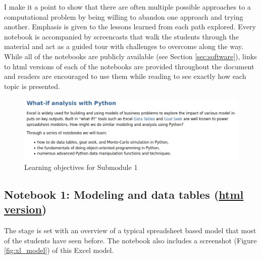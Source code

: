 \documentclass[ited,blindrev]{informs3}              %
\begin{document}
I make it a point to show that there are often multiple possible approaches to a computational problem by being willing to abandon one approach and trying another. Emphasis is given to the lessons learned from each path explored. Every notebook is accompanied by screencasts that walk the students through the material and act as a guided tour with challenges to overcome along the way. While all of the notebooks are publicly available (see Section \ref{sec:software}), links to html versions of each of the notebooks are provided throughout the document and readers are encouraged to use them while reading to see exactly how each topic is presented. 

\begin{figure}[!htbp]
	\includegraphics[width=1.0\textwidth]{objectives_whatif}
	\caption{Learning objectives for Submodule 1}
	\label{fig:objectives_whatif}
\end{figure}
 
 
\subsection{Notebook 1: Modeling and data tables (\href{http://www.sba.oakland.edu/faculty/isken/excel_with_python/what_if_1_model_datatable.html}{html version})}

The stage is set with an overview of a typical spreadsheet based model that most of the students have seen before. The notebook also includes a screenshot (Figure \ref{fig:xl_model}) of this Excel model. 
\end{document}
